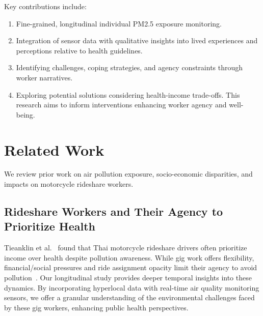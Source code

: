 \documentclass[sigconf,screen,natbib=true]{acmart}
\begin{document}
Key contributions include:
\begin{enumerate}
    \item 
Fine-grained, longitudinal individual PM2.5 exposure monitoring.
    \item 
Integration of sensor data with qualitative insights into lived experiences and perceptions relative to health guidelines.
    \item 
Identifying challenges, coping strategies, and agency constraints through worker narratives.
    \item 
Exploring potential solutions considering health-income trade-offs. This research aims to inform interventions enhancing worker agency and well-being.
\end{enumerate}




























%
 \section{Related Work}
We review prior work on air pollution exposure, socio-economic disparities, and impacts on motorcycle rideshare workers.


\subsection{Rideshare Workers and Their Agency to Prioritize Health}




Tieanklin et al.~\cite{tieanklin2024rideshare} found that Thai motorcycle rideshare drivers often prioritize income over health despite pollution awareness.
While gig work offers flexibility, financial/social pressures and ride assignment opacity limit their agency to avoid pollution~\cite{machado2021midlife,elfassy2019associations}.
Our longitudinal study provides deeper temporal insights into these dynamics.
By incorporating hyperlocal data with real-time air quality monitoring sensors, we offer a granular understanding of the environmental challenges faced by these gig workers, enhancing public health perspectives.
\end{document}
